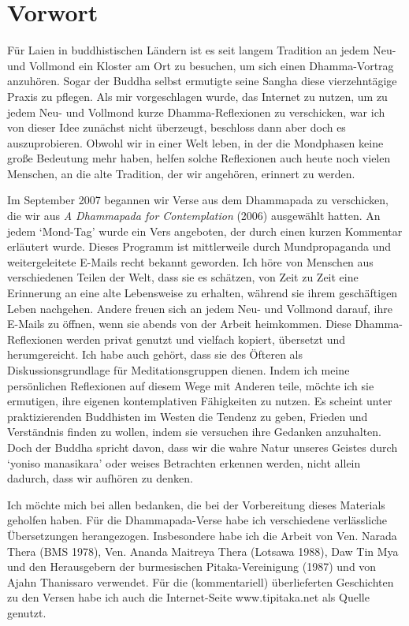 \chapter{Vorwort}

Für Laien in buddhistischen Ländern ist es seit langem Tradition an
jedem Neu- und Vollmond ein Kloster am Ort zu besuchen, um sich einen
Dhamma-Vortrag anzuhören. Sogar der Buddha selbst ermutigte seine Sangha
diese vierzehntägige Praxis zu pflegen. Als mir vorgeschlagen wurde, das
Internet zu nutzen, um zu jedem Neu- und Vollmond kurze
Dhamma-Reflexionen zu verschicken, war ich von dieser Idee zunächst
nicht überzeugt, beschloss dann aber doch es auszuprobieren. Obwohl wir
in einer Welt leben, in der die Mondphasen keine große Bedeutung mehr
haben, helfen solche Reflexionen auch heute noch vielen Menschen, an die
alte Tradition, der wir angehören, erinnert zu werden.

Im September 2007 begannen wir Verse aus dem Dhammapada zu verschicken,
die wir aus \emph{A Dhammapada for Contemplation} (2006) ausgewählt hatten. An
jedem `Mond-Tag' wurde ein Vers angeboten, der durch einen kurzen
Kommentar erläutert wurde. Dieses Programm ist mittlerweile durch
Mundpropaganda und weitergeleitete E-Mails recht bekannt geworden. Ich
höre von Menschen aus verschiedenen Teilen der Welt, dass sie es
schätzen, von Zeit zu Zeit eine Erinnerung an eine alte Lebensweise zu
erhalten, während sie ihrem geschäftigen Leben nachgehen. Andere freuen
sich an jedem Neu- und Vollmond darauf, ihre E-Mails zu öffnen, wenn sie
abends von der Arbeit heimkommen. Diese Dhamma-Reflexionen werden privat
genutzt und vielfach kopiert, übersetzt und herumgereicht. Ich habe auch
gehört, dass sie des Öfteren als Diskussionsgrundlage für
Meditationsgruppen dienen. Indem ich meine persönlichen Reflexionen auf
diesem Wege mit Anderen teile, möchte ich sie ermutigen, ihre eigenen
kontemplativen Fähigkeiten zu nutzen. Es scheint unter praktizierenden
Buddhisten im Westen die Tendenz zu geben, Frieden und Verständnis
finden zu wollen, indem sie versuchen ihre Gedanken anzuhalten. Doch der
Buddha spricht davon, dass wir die wahre Natur unseres Geistes durch
`yoniso manasikara' oder weises Betrachten erkennen werden, nicht allein
dadurch, dass wir aufhören zu denken.

Ich möchte mich bei allen bedanken, die bei der Vorbereitung dieses
Materials geholfen haben. Für die Dhammapada-Verse habe ich verschiedene
verlässliche Übersetzungen herangezogen. Insbesondere habe ich die
Arbeit von Ven. Narada Thera (BMS 1978), Ven. Ananda Maitreya Thera
(Lotsawa 1988), Daw Tin Mya und den Herausgebern der burmesischen
Pitaka-Vereinigung (1987) und von Ajahn Thanissaro verwendet. Für die
(kommentariell) überlieferten Geschichten zu den Versen habe ich auch
die Internet-Seite www.tipitaka.net als Quelle genutzt.

